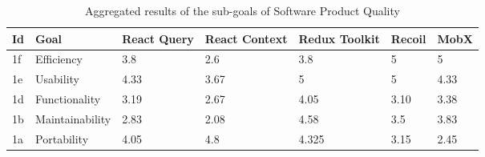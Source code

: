 \begin{longtable}[]{|p{1cm}p{2.5cm}p{1.5cm}p{1.5cm}p{1.5cm}p{1.5cm}p{2cm}|}
    \caption{Aggregated results of the sub-goals of Software Product Quality}
    \label{table:result_aggregated_subgoals}\\
    \toprule
Id & Goal & React Query & React Context & Redux Toolkit & Recoil & MobX \\
\midrule
\endhead
1f & Efficiency & 3.8 & 2.6 & 3.8 & 5 & 5 \\
1e & Usability & 4.33 & 3.67 & 5 & 5 & 4.33 \\
1d & Functionality & 3.19 & 2.67 & 4.05 & 3.10 & 3.38 \\
1b & Maintainability & 2.83 & 2.08 & 4.58 & 3.5 & 3.83 \\
1a & Portability & 4.05 & 4.8 & 4.325 & 3.15 & 2.45 \\
\bottomrule
\end{longtable}
